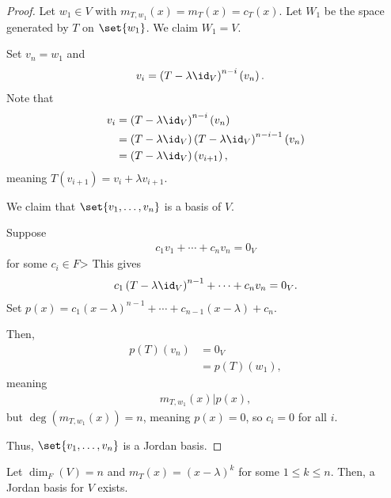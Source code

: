 \documentclass[10pt]{mypackage}
\begin{document}
\begin{proof}
  Let $w_1\in V$ with $m_{T,w_1}(x) = m_{T}(x) = c_T(x)$. Let $W_1$ be the space generated by $T$ on $\set{w_1}$. We claim $W_1 = V$.\newline

  Set $v_n = w_1$ and
  \begin{align*}
    v_i &= \left(T-\lambda\id_V\right)^{n-i}\left(v_n\right).
  \end{align*}
  Note that
  \begin{align*}
    v_i &= \left(T-\lambda\id_V\right)^{n-i}\left(v_n\right)\\
        &= \left(T-\lambda\id_V\right)\left(T-\lambda\id_V\right)^{n-i-1}\left(v_n\right)\\
        &= \left(T-\lambda\id_V\right)\left(v_{i+1}\right),
  \end{align*}
  meaning $T\left(v_{i+1}\right) = v_i + \lambda v_{i+1}$.\newline

  We claim that $\set{v_1,\dots,v_n}$ is a basis of $V$.\newline

  Suppose
  \begin{align*}
    c_1 v_1 + \cdots + c_nv_n = 0_V
  \end{align*}
  for some $c_i\in F$> This gives
  \begin{align*}
    c_1\left(T-\lambda\id_V\right)^{n-1} + \cdots + c_{n}v_n = 0_V.
  \end{align*}
  Set $p(x) = c_1(x-\lambda)^{n-1} + \cdots + c_{n-1}\left(x-\lambda\right) + c_n$.\newline

  Then,
  \begin{align*}
    p(T)\left(v_n\right) &= 0_V\\
                         &= p(T)\left(w_1\right),
  \end{align*}
  meaning
  \begin{align*}
    m_{T,w_1}\left(x\right)|p(x),
  \end{align*}
  but $\deg\left(m_{T,w_1}(x)\right) = n$, meaning $p(x) = 0$, so $c_i = 0$ for all $i$.\newline

  Thus, $\set{v_1,\dots,v_n}$ is a Jordan basis.
\end{proof}
\begin{proposition}
  Let $\dim_{F}\left(V\right) = n$ and $m_T(x) = \left(x-\lambda\right)^k$ for some $1\leq k \leq n$. Then, a Jordan basis for $V$ exists.
\end{proposition}
\end{document}

